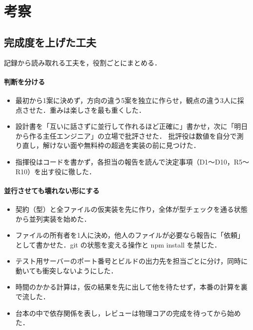 \documentclass[a4paper,10pt]{ltjsarticle}
\begin{document}
\section{考察}

\subsection{完成度を上げた工夫}
記録から読み取れる工夫を，役割ごとにまとめる．

\paragraph{判断を分ける}
\begin{itemize}
  \item 最初から1案に決めず，方向の違う5案を独立に作らせ，観点の違う3人に採点させた．重みは楽しさを最も重くした．
  \item 設計書を「互いに話さずに並行して作れるほど正確に」書かせ，次に「明日から作る主任エンジニア」の立場で批評させた．
  批評役は数値を自分で測り直し，解けない面や無料枠の超過を実装の前に見つけた．
  \item 指揮役はコードを書かず，各担当の報告を読んで決定事項（D1〜D10，R5〜R10）を出す役に徹した．
\end{itemize}

\paragraph{並行させても壊れない形にする}
\begin{itemize}
  \item 契約（型）と全ファイルの仮実装を先に作り，全体が型チェックを通る状態から並列実装を始めた．
  \item ファイルの所有者を1人に決め，他人のファイルが必要なら報告に「依頼」として書かせた．git の状態を変える操作と npm install を禁じた．
  \item テスト用サーバーのポート番号とビルドの出力先を担当ごとに分け，同時に動いても衝突しないようにした．
  \item 時間のかかる計算は，仮の結果を先に出して他を待たせず，本番の計算を裏で流した．
  \item 台本の中で依存関係を表し，レビューは物理コアの完成を待ってから始めた．
\end{itemize}
\end{document}
